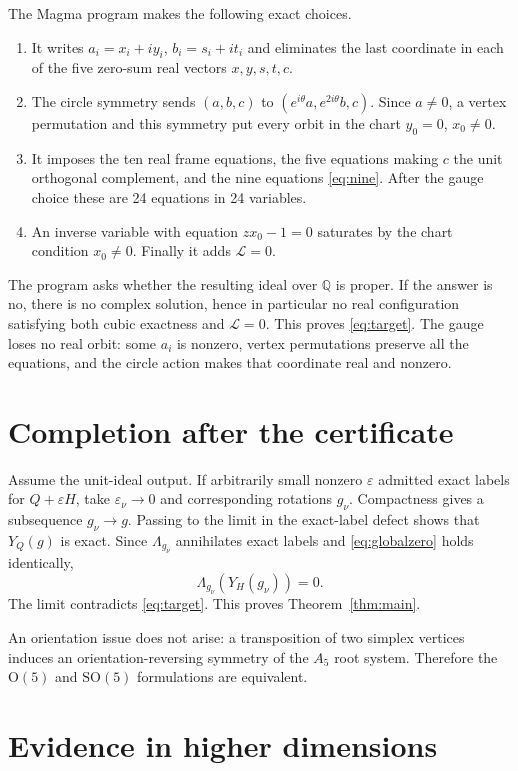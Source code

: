 \documentclass[11pt,reqno]{amsart}
\theoremstyle{remark}
\newcommand{\SO}{\mathrm{SO}}
\newcommand{\eps}{\varepsilon}
\begin{document}
The Magma program makes the following exact choices.
\begin{enumerate}
\item It writes $a_i=x_i+iy_i$, $b_i=s_i+it_i$ and eliminates the last
coordinate in each of the five zero-sum real vectors $x,y,s,t,c$.
\item The circle symmetry sends $(a,b,c)$ to
$(e^{i\theta}a,e^{2i\theta}b,c)$.  Since $a\ne0$, a vertex permutation and
this symmetry put every orbit in the chart $y_0=0$, $x_0\ne0$.
\item It imposes the ten real frame equations, the five equations making $c$
the unit orthogonal complement, and the nine equations
\eqref{eq:nine}.  After the gauge choice these are 24 equations in 24
variables.
\item An inverse variable with equation $z x_0-1=0$ saturates by the chart
condition $x_0\ne0$.  Finally it adds $\mathcal L=0$.
\end{enumerate}
The program asks whether the resulting ideal over $\mathbb Q$ is proper.  If
the answer is no, there is no complex solution, hence in particular no real
configuration satisfying both cubic exactness and $\mathcal L=0$.  This proves
\eqref{eq:target}.  The gauge loses no real orbit: some $a_i$ is nonzero,
vertex permutations preserve all the equations, and the circle action makes
that coordinate real and nonzero.

\section{Completion after the certificate}

Assume the unit-ideal output.  If arbitrarily small nonzero $\eps$ admitted
exact labels for $Q+\eps H$, take $\eps_\nu\to0$ and corresponding rotations
$g_\nu$.  Compactness gives a subsequence $g_\nu\to g$.  Passing to the limit
in the exact-label defect shows that $Y_Q(g)$ is exact.  Since $\Lambda_{g_\nu}$
annihilates exact labels and \eqref{eq:globalzero} holds identically,
\[
 \Lambda_{g_\nu}(Y_H(g_\nu))=0.
\]
The limit contradicts \eqref{eq:target}.  This proves
Theorem~\ref{thm:main}.

An orientation issue does not arise: a transposition of two simplex vertices
induces an orientation-reversing symmetry of the $A_5$ root system.  Therefore
the $\mathrm O(5)$ and $\SO(5)$ formulations are equivalent.

\section{Evidence in higher dimensions}
\end{document}
